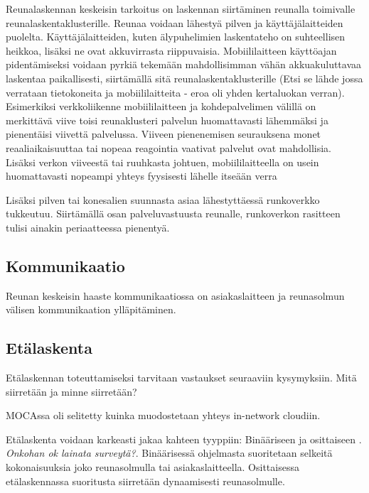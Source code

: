 \documentclass[finnish]{tktltiki2}
\theoremstyle{definition}
\theoremstyle{remark}
\begin{document}
Reunalaskennan keskeisin tarkoitus on laskennan siirtäminen reunalla toimivalle reunalaskentaklusterille. Reunaa voidaan lähestyä pilven ja käyttäjälaitteiden puolelta. Käyttäjälaitteiden, kuten älypuhelimien laskentateho on suhteellisen heikkoa, lisäksi ne ovat akkuvirrasta riippuvaisia. 
Mobiililaitteen käyttöajan pidentämiseksi voidaan pyrkiä tekemään mahdollisimman vähän akkuakuluttavaa laskentaa paikallisesti, siirtämällä sitä reunalaskentaklusterille (Etsi se lähde jossa verrataan tietokoneita ja mobiililaitteita - eroa oli yhden kertaluokan verran).
Esimerkiksi verkkoliikenne mobiililaitteen ja kohdepalvelimen välillä on merkittävä viive toisi reunaklusteri palvelun huomattavasti lähemmäksi ja pienentäisi viivettä palvelussa. Viiveen pienenemisen seurauksena monet reaaliaikaisuuttaa tai nopeaa reagointia vaativat palvelut ovat mahdollisia. Lisäksi verkon viiveestä tai ruuhkasta johtuen, mobiililaitteella on usein huomattavasti nopeampi yhteys fyysisesti lähelle itseään verra

Lisäksi pilven tai konesalien suunnasta asiaa lähestyttäessä runkoverkko tukkeutuu. Siirtämällä osan palveluvastuusta reunalle, runkoverkon rasitteen tulisi ainakin periaatteessa pienentyä. 

\subsection{Kommunikaatio}
Reunan keskeisin haaste kommunikaatiossa on asiakaslaitteen ja reunasolmun välisen kommunikaation ylläpitäminen.

\subsection{Etälaskenta}
Etälaskennan toteuttamiseksi tarvitaan vastaukset seuraaviin kysymyksiin. Mitä siirretään ja minne siirretään?

MOCAssa oli selitetty kuinka muodostetaan yhteys in-network cloudiin.

Etälaskenta voidaan karkeasti jakaa kahteen tyyppiin: Binääriseen ja osittaiseen \cite{mao17}. \textit{Onkohan ok lainata surveytä?}. Binäärisessä ohjelmasta suoritetaan selkeitä kokonaisuuksia joko reunasolmulla tai asiakaslaitteella. Osittaisessa etälaskennassa suoritusta siirretään dynaamisesti reunasolmulle. 
\end{document}
